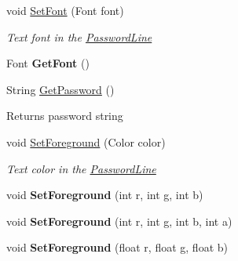 \begin{DoxyCompactItemize}
void \mbox{\hyperlink{class_space_v_i_l_1_1_password_line_a39c41fdf3ef352cd2b51d5cee342dfa4}{Set\+Font}} (Font font)
\begin{DoxyCompactList}\small\item\em Text font in the \mbox{\hyperlink{class_space_v_i_l_1_1_password_line}{Password\+Line}} \end{DoxyCompactList}\item 
\mbox{\label{class_space_v_i_l_1_1_password_line_a13f9c6c3d476f3a3d6483b08a414b744}} 
Font {\bfseries Get\+Font} ()
\item 
\mbox{\label{class_space_v_i_l_1_1_password_line_acf665674b31eb9743a05f4a22c2ed055}} 
String \mbox{\hyperlink{class_space_v_i_l_1_1_password_line_acf665674b31eb9743a05f4a22c2ed055}{Get\+Password}} ()
\begin{DoxyCompactList}\small\item\em \begin{DoxyReturn}{Returns}
password string 
\end{DoxyReturn}
\end{DoxyCompactList}\item 
void \mbox{\hyperlink{class_space_v_i_l_1_1_password_line_a9ca1d5dc8f4f3f3036f8a8098930b350}{Set\+Foreground}} (Color color)
\begin{DoxyCompactList}\small\item\em Text color in the \mbox{\hyperlink{class_space_v_i_l_1_1_password_line}{Password\+Line}} \end{DoxyCompactList}\item 
\mbox{\label{class_space_v_i_l_1_1_password_line_a8453eb5f5c85540e9656b4e2ca05b97d}} 
void {\bfseries Set\+Foreground} (int r, int g, int b)
\item 
\mbox{\label{class_space_v_i_l_1_1_password_line_a1e36928fa9e8d1b0c9f50a8a24919f0a}} 
void {\bfseries Set\+Foreground} (int r, int g, int b, int a)
\item 
\mbox{\label{class_space_v_i_l_1_1_password_line_ad05d4f1f57674c394080f28bf0f16183}} 
void {\bfseries Set\+Foreground} (float r, float g, float b)
\item 
\mbox{\label{class_space_v_i_l_1_1_password_line_a0a328277276d9f309e8499372f2d898d}} 

\end{DoxyCompactItemize}
